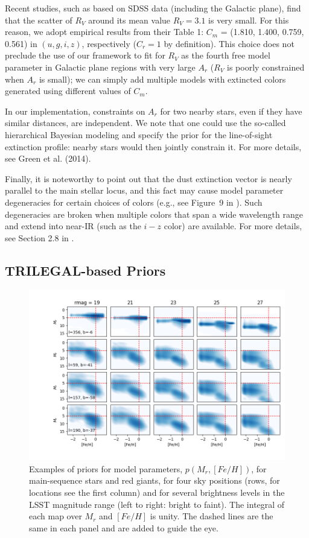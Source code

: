 Recent studies, such as \cite{2012ApJ...757..166B} based on SDSS data (including the Galactic plane), 
find that the scatter of $R_V$ around its mean value $R_V=3.1$ is very small. For this reason, we adopt
empirical results from their Table 1: $C_m$ = (1.810, 1.400, 0.759, 0.561) in $(u, g, i, z)$, respectively ($C_r=1$
by definition). This choice does not preclude the use of our framework to fit for $R_V$ as the fourth free
model parameter in Galactic plane regions with very large $A_r$ ($R_V$ is poorly constrained when $A_r$ is small);
we  can simply add multiple models with extincted colors generated using different values of $C_m$.

In our implementation, constraints on $A_r$ for two nearby stars, even if they have similar distances,
are independent. We note that one could use the so-called hierarchical Bayesian modeling  and specify the prior
for the line-of-sight extinction profile: nearby stars would then jointly constrain it. For more
details, see Green et al. (2014).

Finally, it is noteworthy to point out that the dust extinction vector is nearly parallel to the main stellar locus,
and this fact may cause model parameter degeneracies for certain choices of colors (e.g., see Figure~9 in
\citealt{2012ApJ...757..166B}). Such degeneracies are broken when multiple colors that span a wide
wavelength range and extend into near-IR (such as the $i-z$ color) are available. For more details, see
Section 2.8 in \cite{2012ApJ...757..166B}.


\subsection{TRILEGAL-based Priors} 

\begin{figure}[t!]
\hskip -0.5in
\includegraphics[width=1.07\textwidth,angle=0]{figures/Stripe82priorMosaic.png}
\vskip -0.4in  
\caption{Examples of priors for model parameters, $p(M_r, [Fe/H])$, for main-sequence stars and red giants,
  for four sky positions (rows, for locations see the first column) and for several brightness levels in the LSST
  magnitude range (left to right: bright to faint). The integral of each map over $M_r$ and $[Fe/H]$ is unity. 
  The dashed lines are the same in each panel and are added to guide the eye. 
}
\label{fig:priorsAstroLab}
\end{figure}


